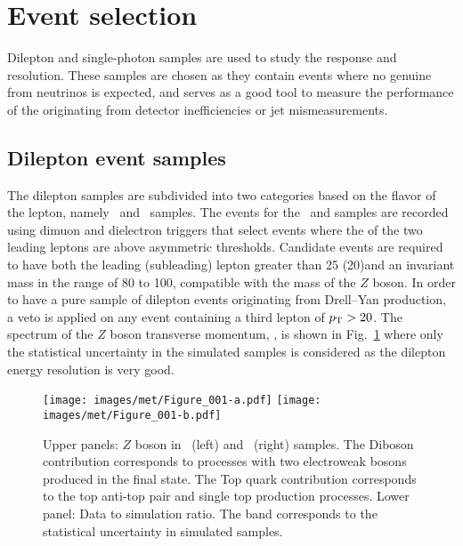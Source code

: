 \section{Event selection}\label{sec:simulation_selection}
Dilepton and single-photon samples are used to study the \ptmiss response and resolution. 
These samples are chosen as they contain events where no genuine \ptmiss from neutrinos is expected, and serves as a good tool to measure the performance of the \ptmiss originating from detector inefficiencies or jet mismeasurements.  
\subsection{Dilepton event samples}
\label{sec:zselection}
The dilepton samples are subdivided into two categories based on the flavor of the lepton, namely \Zmm\ and \Zee\ samples. 
The events for the \Zmm\ and \Zee samples are recorded using dimuon and dielectron triggers that select events where the \pt of the two leading leptons are above asymmetric thresholds. 
Candidate events are required to have both the leading (subleading) lepton \pt greater than 25 (20)\GeV and an invariant mass in the range of 80 to 100\GeV, compatible with the mass of the 
$Z$ boson.
In order to have a pure sample of dilepton events originating from Drell--Yan production, a veto is applied on any event containing a third lepton of $p_{\mathrm{T}} > 20$\GeV. 
The spectrum of the $Z$ boson transverse momentum, \qt, is shown in Fig.~\ref{fig:zbosonpt} where only the statistical uncertainty in the simulated samples is considered as the dilepton energy resolution is very good.
\begin{figure}[!htb]
  \centering
  \texttt{[image: images/met/Figure\_001-a.pdf]}
  \texttt{[image: images/met/Figure\_001-b.pdf]}
  \caption{Upper panels: $Z$ boson \qt in \Zmm\ (left) and \Zee\ (right) samples. The Diboson contribution corresponds to processes with two electroweak bosons produced in the final state. The Top quark contribution corresponds to the top anti-top pair and single top production processes. Lower panel: Data to simulation ratio. The band corresponds to the statistical uncertainty in simulated samples. }
  \label{fig:zbosonpt}
\end{figure}
